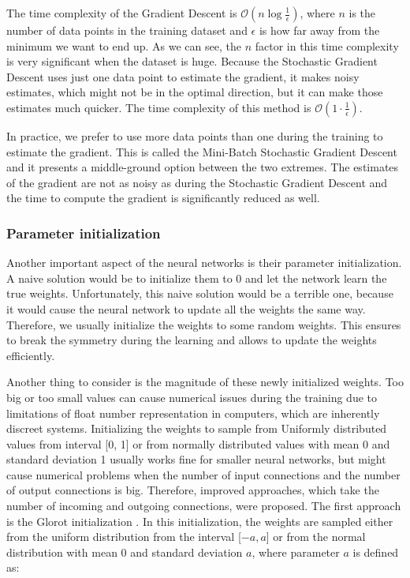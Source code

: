 The time complexity of the Gradient Descent is $\mathcal{O}(n\log{\frac{1}{\epsilon}})$, where $n$ is the number of data points in the training dataset and $\epsilon$ is how far away from the minimum we want to end up.
As we can see, the $n$ factor in this time complexity is very significant when the dataset is huge.
Because the Stochastic Gradient Descent uses just one data point to estimate the gradient, it makes noisy estimates, which might not be in the optimal direction, but it can make those estimates much quicker.%
The time complexity of this method is $\mathcal{O}(1\cdot\frac{1}{\epsilon})$.

In practice, we prefer to use more data points than one during the training to estimate the gradient.
This is called the Mini-Batch Stochastic Gradient Descent and it presents a middle-ground option between the two extremes.
The estimates of the gradient are not as noisy as during the Stochastic Gradient Descent and the time to compute the gradient is significantly reduced as well. 


\subsubsection{Parameter initialization}
Another important aspect of the neural networks is their parameter initialization.
A naive solution would be to initialize them to 0 and let the network learn the true weights.
Unfortunately, this naive solution would be a terrible one, because it would cause the neural network to update all the weights the same way.
Therefore, we usually initialize the weights to some random weights.
This ensures to break the symmetry during the learning and allows to update the weights efficiently.

Another thing to consider is the magnitude of these newly initialized weights.
Too big or too small values can cause numerical issues during the training due to limitations of float number representation in computers, which are inherently discreet systems.
Initializing the weights to sample from Uniformly distributed values from interval [0, 1] or from normally distributed values with mean 0 and standard deviation 1 usually works fine for smaller neural networks, but might cause numerical problems when the number of input connections and the number of output connections is big.
Therefore, improved approaches, which take the number of incoming and outgoing connections, were proposed.
The first approach is the Glorot initialization \cite{glorot2010understanding}.
In this initialization, the weights are sampled either from the uniform distribution from the interval [$-a, a$] or from the normal distribution with mean 0 and standard deviation $a$, where parameter $a$ is defined as:

